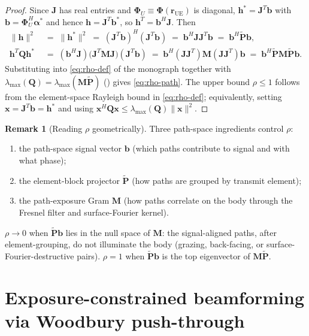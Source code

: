 \documentclass[11pt,a4paper]{article}
\theoremstyle{definition}
\newtheorem{remark}[remark]{Remark}
\newcommand{\rr}{\mathbf{r}}
\newcommand{\Jmat}{\mathbf{J}}                 %
\newcommand{\Phimat}{\mathbf{\Phi}}            %
\newcommand{\Mmat}{\mathbf{M}}                 %
\newcommand{\Qmat}{\mathbf{Q}}                 %
\newcommand{\Pmat}{\tilde{\mathbf{P}}}         %
\newcommand{\xx}{\mathbf{x}}
\newcommand{\hh}{\mathbf{h}}
\newcommand{\bvec}{\mathbf{b}}
\newcommand{\alphavec}{\bm{\alpha}}
\begin{document}
\begin{proof}
Since $\Jmat$ has real entries and $\Phimat_U\equiv\Phimat(\rr_\mathrm{UE})$
is diagonal, $\hh^*=\Jmat^T\bvec$ with $\bvec=\Phimat_U^H\alphavec^*$ and
hence $\hh=\Jmat^T\bvec^*$, so $\hh^T=\bvec^H\Jmat$.  Then
\begin{align*}
  \|\hh\|^2 &\;=\;\|\hh^*\|^2
           \;=\;(\Jmat^T\bvec)^H(\Jmat^T\bvec)
           \;=\;\bvec^H\Jmat\Jmat^T\bvec
           \;=\;\bvec^H\Pmat\bvec,\\[0.3em]
  \hh^T\Qmat\hh^* &\;=\;(\bvec^H\Jmat)\bigl(\Jmat^T\Mmat\Jmat\bigr)(\Jmat^T\bvec)
                  \;=\;\bvec^H(\Jmat\Jmat^T)\Mmat(\Jmat\Jmat^T)\bvec
                  \;=\;\bvec^H\Pmat\Mmat\Pmat\bvec.
\end{align*}
Substituting into \cref{eq:rho-def} of the monograph together with
$\lambda_{\max}(\Qmat)=\lambda_{\max}(\Mmat\Pmat)$ ()
gives \eqref{eq:rho-path}.  The upper bound $\rho\le 1$ follows from the
element-space Rayleigh bound in \cref{eq:rho-def}; equivalently, setting
$\xx=\Jmat^T\bvec=\hh^*$ and using
$\xx^H\Qmat\xx\le\lambda_{\max}(\Qmat)\|\xx\|^2$.
\end{proof}

\begin{remark}[Reading $\rho$ geometrically]\label{rem:rho-geom}
Three path-space ingredients control $\rho$:
\begin{enumerate}[leftmargin=1.7em,itemsep=0.2em]
  \item the path-space signal vector $\bvec$ (which paths contribute to
  signal and with what phase);
  \item the element-block projector $\Pmat$ (how paths are grouped by
  transmit element);
  \item the path-exposure Gram $\Mmat$ (how paths correlate on the body
  through the Fresnel filter and surface-Fourier kernel).
\end{enumerate}
$\rho\to 0$ when $\Pmat\bvec$ lies in the null space of $\Mmat$: the
signal-aligned paths, after element-grouping, do not illuminate the body
(grazing, back-facing, or surface-Fourier-destructive pairs).  $\rho=1$
when $\Pmat\bvec$ is the top eigenvector of $\Mmat\Pmat$.
\end{remark}

\section{Exposure-constrained beamforming via Woodbury push-through}
\label{sec:ecbf-path}
\end{document}
